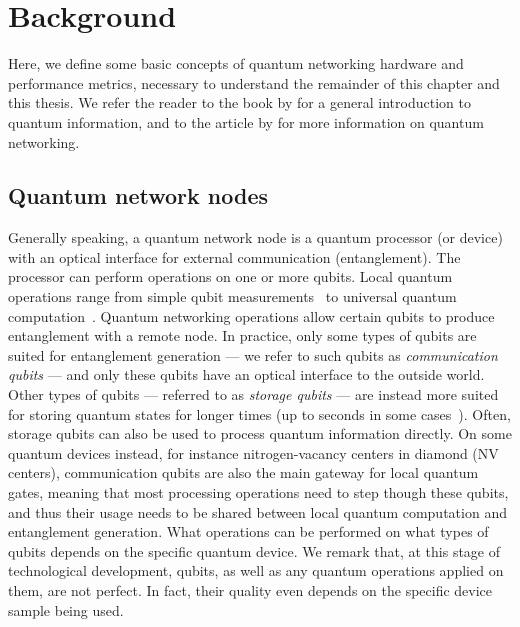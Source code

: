 \section{Background}
\label{sec:background:background}

Here, we define some basic concepts of quantum networking hardware and performance metrics,
necessary to understand the remainder of this chapter and this thesis. We refer the reader to the
book  by \textcite{nielsen_chuang_2002} for a general introduction to
quantum information, and to the article  by
\textcite{dahlberg_2019_egp} for more information on quantum networking. 

\subsection{Quantum network nodes}

Generally speaking, a quantum network node is a quantum processor (or device) with an optical
interface for external communication (entanglement). The processor can perform operations on one or
more qubits. Local quantum operations range from simple qubit
measurements~\cite{vallone_2015_satellite, yin_2017_satellite} to universal quantum
computation~\cite{bernien_2013_heralded, humphreys_2018_delivery, pompili_2021_multinode,
moehring_2007_ion_traps, reiserer_2015_neutral_atoms}. Quantum networking operations allow certain
qubits to produce entanglement with a remote node. In practice, only some types of qubits are suited
for entanglement generation --- we refer to such qubits as \emph{communication qubits} --- and only
these qubits have an optical interface to the outside world. Other types of qubits --- referred to
as \emph{storage qubits} --- are instead more suited for storing quantum states for longer times (up
to seconds in some cases~\cite{abobeih_2018_one_sec, bradley_2019_one_min}). Often, storage qubits
can also be used to process quantum information directly. On some quantum devices instead, for
instance nitrogen-vacancy centers in diamond (NV centers), communication qubits are also the main
gateway for local quantum gates, meaning that most processing operations need to step though these
qubits, and thus their usage needs to be shared between local quantum computation and entanglement
generation. What operations can be performed on what types of qubits depends on the specific quantum
device. We remark that, at this stage of technological development, qubits, as well as any quantum
operations applied on them, are not perfect. In fact, their quality even depends on the specific
device sample being used.

